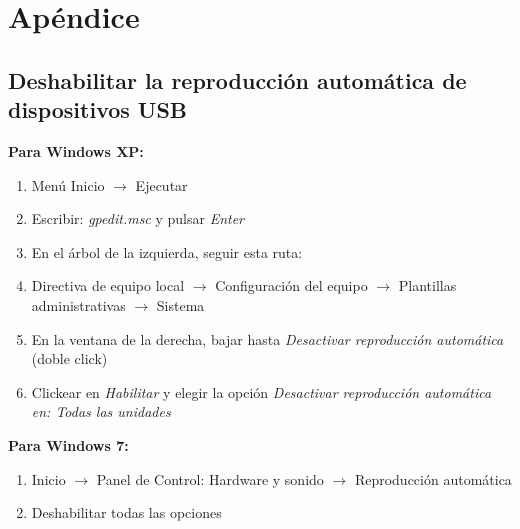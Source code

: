 \chapter*{Apéndice}
\section*{Deshabilitar la reproducción automática de dispositivos USB}
\textbf{Para Windows XP:}

\begin{enumerate}
  \item Menú Inicio $\rightarrow$ Ejecutar
  \item Escribir: \textit{gpedit.msc} y pulsar \textit{Enter}
  \item En el árbol de la izquierda, seguir esta ruta:
  \item Directiva de equipo local $\rightarrow$ Configuración del equipo $\rightarrow$ Plantillas administrativas $\rightarrow$ Sistema
  \item En la ventana de la derecha, bajar hasta \textit{Desactivar reproducción automática} (doble click)
  \item Clickear en \textit{Habilitar} y elegir la opción \textit{Desactivar reproducción automática en: Todas las unidades}
\end{enumerate}


\textbf{Para Windows 7:}

\begin{enumerate}
  \item Inicio $\rightarrow$ Panel de Control: Hardware y sonido $\rightarrow$ Reproducción automática
  \item Deshabilitar todas las opciones
\end{enumerate}
